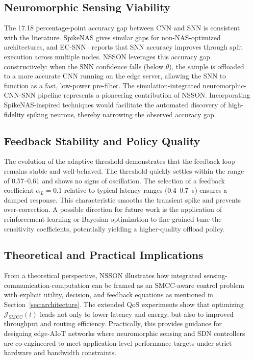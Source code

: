 \documentclass[journal]{IEEEtran}
\begin{document}
\subsection{Neuromorphic Sensing Viability}
The 17.18 percentage-point accuracy gap between CNN and SNN is consistent
with the literature. SpikeNAS \cite{putra2025spikenas} gives similar gaps for non-NAS-optimized architectures, and EC-SNN~\cite{di2024ec} reports that SNN accuracy improves through split execution across multiple nodes. NSSON leverages this accuracy gap constructively: when the SNN confidence falls (below $\theta$), the sample is offloaded to a more accurate CNN running on the edge server, allowing the SNN to function as a fast, low-power pre-filter. The simulation-integrated neuromorphic-CNN-SNN pipeline represents a pioneering contribution of NSSON. Incorporating SpikeNAS-inspired techniques would facilitate the automated discovery of high-fidelity spiking neurons, thereby narrowing the observed accuracy gap.

\subsection{Feedback Stability and Policy Quality}
The evolution of the adaptive threshold demonstrates that the feedback loop remains stable and well-behaved. The threshold quickly settles within the range of 0.57--0.61 and shows no signs of oscillation. The selection of a feedback coefficient $\alpha_L = 0.1$ relative to typical latency ranges (0.4--0.7~s) ensures a damped response. This characteristic smooths the transient spike and prevents over-correction. A possible direction for future work is the application of reinforcement learning or Bayesian optimization to fine-grained tune the sensitivity coefficients, potentially yielding a higher-quality offload policy.

\subsection{Theoretical and Practical Implications}

From a theoretical perspective, NSSON illustrates how integrated sensing-communication-computation can be framed as an SMCC-aware control problem with explicit utility, decision, and feedback equations as mentioned in Section~\ref{sec:architecture}. The extended QoS experiments show that optimizing $\mathcal{J}_{\mathrm{SMCC}}(t)$ leads not only to lower latency and energy, but also to improved throughput and routing efficiency. Practically, this provides guidance for designing edge-AIoT networks where neuromorphic sensing and SDN controllers are co-engineered to meet application-level performance targets under strict hardware and bandwidth constraints.
\end{document}
